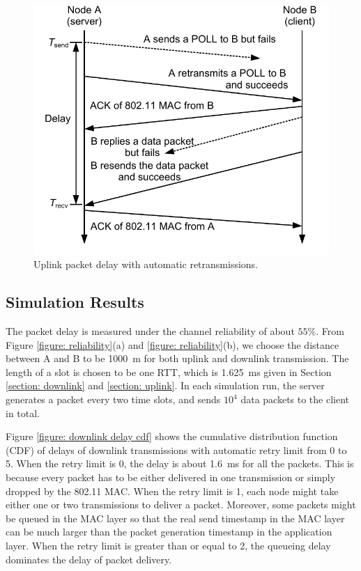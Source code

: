 \documentclass{article}
\begin{document}
\begin{figure}[htbp]
\centering
\includegraphics[scale = 0.7]{uplink_delay.pdf}
\caption{Uplink packet delay with automatic retransmissions.}
\label{figure: uplink delay}
\end{figure}

\subsection{Simulation Results}
The packet delay is measured under the channel reliability of about $55\%$. From Figure \ref{figure: reliability}(a) and \ref{figure: reliability}(b), we choose the distance between A and B to be \SI{1000}{m} for both uplink and downlink transmission. The length of a slot is chosen to be one RTT, which is \SI{1.625}{ms} given in Section \ref{section: downlink} and \ref{section: uplink}. In each simulation run, the server generates a packet every two time slots, and sends $10^4$ data packets to the client in total.

Figure \ref{figure: downlink delay cdf} shows the cumulative distribution function (CDF) of delays of downlink transmissions with automatic retry limit from 0 to 5. When the retry limit is 0, the delay is about \SI{1.6}{ms} for all the packets. This is because every packet has to be either delivered in one transmission or simply dropped by the 802.11 MAC. When the retry limit is 1, each node might take either one or two transmissions to deliver a packet. Moreover, some packets might be queued in the MAC layer so that the real send timestamp in the MAC layer can be much larger than the packet generation timestamp in the application layer. When the retry limit is greater than or equal to 2, the queueing delay dominates the delay of packet delivery. 
\end{document}
